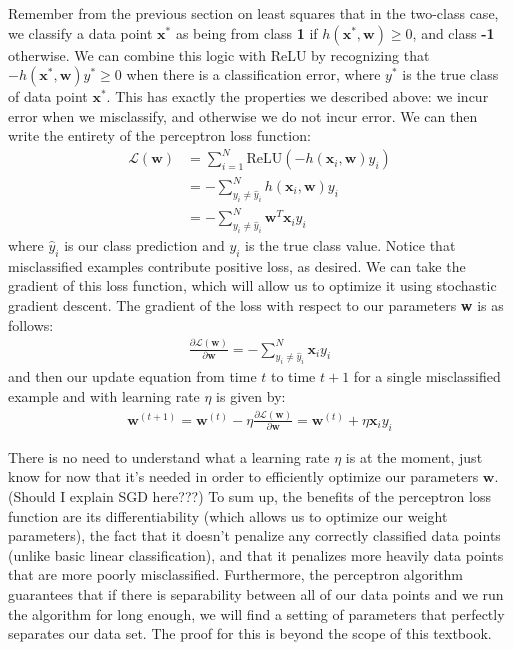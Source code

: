 Remember from the previous section on least squares that in the two-class case, we classify a data point $\textbf{x}^{*}$ as being from class 
\textbf{1} if $h(\textbf{x}^{*}, \textbf{w}) \geq 0$, and class \textbf{-1} otherwise. We can combine this logic with ReLU by recognizing that $-h(\textbf{x}^{*}, \textbf{w})y^{*} \geq 0$ when there is a classification error, where $y^{*}$ is the true class of data point $\textbf{x}^{*}$. This has exactly the properties we described above: we incur error when we misclassify, and otherwise we do not incur error. \newline \newline
We can then write the entirety of the perceptron loss function:
\begin{align}
	\mathcal{L}(\textbf{w}) &= \sum_{i=1}^{N} \text{ReLU}(-h(\textbf{x}_{i}, \textbf{w})y_{i}) \\
	&= -\sum_{y_{i} \neq \hat{y}_{i}}^{N} h(\textbf{x}_{i}, \textbf{w})y_{i} \\
	&= -\sum_{y_{i} \neq \hat{y}_{i}}^{N} \textbf{w}^{T}\textbf{x}_{i} y_{i}
\end{align}
where $\hat{y}_{i}$ is our class prediction and $y_{i}$ is the true class value. Notice that misclassified examples contribute positive loss, as desired. We can take the gradient of this loss function, which will allow us to optimize it using stochastic gradient descent. The gradient of the loss with respect to our parameters \textbf{w} is as follows:
\begin{align*}
	\frac{\partial \mathcal{L}(\textbf{w})}{\partial \textbf{w}} = -\sum_{y_{i} \neq \hat{y}_{i}}^{N} \textbf{x}_{i} y_{i}
\end{align*}
and then our update equation from time $t$ to time $t+1$ for a single misclassified example and with learning rate $\eta$ is given by:
\begin{align*}
	\textbf{w}^{(t+1)} = \textbf{w}^{(t)} - \eta\frac{\partial \mathcal{L}(\textbf{w})}{\partial \textbf{w}} = \textbf{w}^{(t)} + \eta \textbf{x}_{i} y_{i}
\end{align*}

There is no need to understand what a learning rate $\eta$ is at the moment, just know for now that it's needed in order to efficiently optimize our parameters $\textbf{w}$. (Should I explain SGD here???) To sum up, the benefits of the perceptron loss function are its differentiability (which allows us to optimize our weight parameters), the fact that it doesn't penalize any correctly classified data points (unlike basic linear classification), and that it penalizes more heavily data points that are more poorly misclassified. Furthermore, the perceptron algorithm guarantees that if there is separability between all of our data points and we run the algorithm for long enough, we will find a setting of parameters that perfectly separates our data set. The proof for this is beyond the scope of this textbook.

